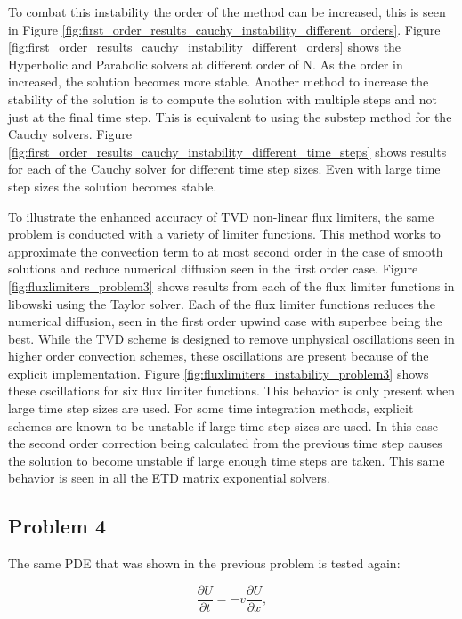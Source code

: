 \clearpage


\noindent To combat this instability the order of the method can be increased, this is seen in Figure \ref{fig:first_order_results_cauchy_instability_different_orders}. Figure \ref{fig:first_order_results_cauchy_instability_different_orders} shows the Hyperbolic and Parabolic solvers at different order of N. As the order in increased, the solution becomes more stable.  Another method to increase the stability of the solution is to compute the solution with multiple steps and not just at the final time step. This is equivalent to using the substep method for the Cauchy solvers. Figure \ref{fig:first_order_results_cauchy_instability_different_time_steps} shows results for each of the Cauchy solver for different time step sizes. Even with large time step sizes the solution becomes stable. 

To illustrate the enhanced accuracy of TVD non-linear flux limiters, the same problem is conducted with a variety of limiter functions. This method works to approximate the convection term to at most second order in the case of smooth solutions and reduce numerical diffusion seen in the first order case. Figure \ref{fig:fluxlimiters_problem3} shows results from each of the flux limiter functions in libowski using the Taylor solver. Each of the flux limiter functions reduces the numerical diffusion, seen in the first order upwind case with superbee being the best. While the TVD scheme is designed to remove unphysical oscillations seen in higher order convection schemes, these oscillations are present because of the explicit implementation. Figure \ref{fig:fluxlimiters_instability_problem3} shows these oscillations for six flux limiter functions. This behavior is only present when large time step sizes are used. For some time integration methods, explicit schemes are known to be unstable if large time step sizes are used. In this case the second order correction being calculated from the previous time step causes the solution to become unstable if large enough time steps are taken. This same behavior is seen in all the ETD matrix exponential solvers. 



\subsection{Problem 4}

The same PDE that was shown in the previous problem is tested again:

\begin{equation}
    \frac{\partial U}{\partial t} = -v\frac{\partial U}{\partial x},
    \label{eq:convection_PDE}
\end{equation}

